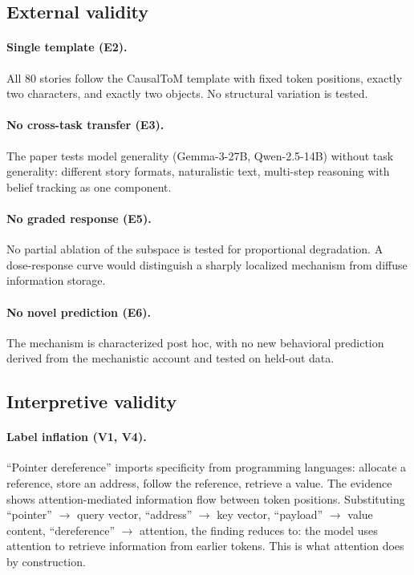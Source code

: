 \documentclass[11pt]{article}
\begin{document}
\subsection{External validity}

\paragraph{Single template (E2).}
All 80 stories follow the CausalToM template with fixed token positions, exactly two characters, and exactly two objects. No structural variation is tested.

\paragraph{No cross-task transfer (E3).}
The paper tests model generality (Gemma-3-27B, Qwen-2.5-14B) without task generality: different story formats, naturalistic text, multi-step reasoning with belief tracking as one component.

\paragraph{No graded response (E5).}
No partial ablation of the subspace is tested for proportional degradation. A dose-response curve would distinguish a sharply localized mechanism from diffuse information storage.

\paragraph{No novel prediction (E6).}
The mechanism is characterized post hoc, with no new behavioral prediction derived from the mechanistic account and tested on held-out data.

\subsection{Interpretive validity}

\paragraph{Label inflation (V1, V4).}
``Pointer dereference'' imports specificity from programming languages: allocate a reference, store an address, follow the reference, retrieve a value. The evidence shows attention-mediated information flow between token positions. Substituting ``pointer'' $\rightarrow$ query vector, ``address'' $\rightarrow$ key vector, ``payload'' $\rightarrow$ value content, ``dereference'' $\rightarrow$ attention, the finding reduces to: the model uses attention to retrieve information from earlier tokens. This is what attention does by construction.
\end{document}
